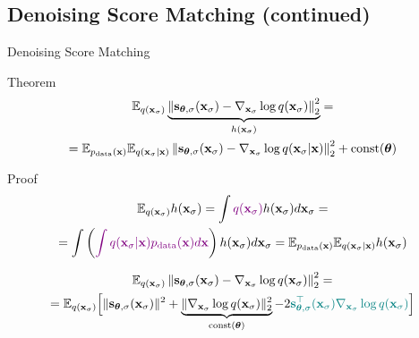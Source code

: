 \documentclass{beamer}
\renewcommand{\eqpause}{}
\renewcommand{\nextonslide}[1]{#1}
\begin{document}
\subsection{Denoising Score Matching (continued)}
\begin{frame}{Denoising Score Matching}
	\begin{block}{Theorem}
	\vspace{-0.5cm}
	\begin{multline*}
		\mathbb{E}_{q(\mathbf{x}_{\sigma})}\underbrace{\left\| \mathbf{s}_{\boldsymbol{\theta}, \sigma}(\mathbf{x}_{\sigma}) - \nabla_{\mathbf{x}_{\sigma}} \log q(\mathbf{x}_{\sigma}) \right\|_2^2}_{h(\mathbf{x}_{\sigma})} = \\
		= \mathbb{E}_{p_{\text{data}}(\mathbf{x})} \mathbb{E}_{q(\mathbf{x}_{\sigma} | \mathbf{x})}\left\| \mathbf{s}_{\boldsymbol{\theta}, \sigma}(\mathbf{x}_{\sigma}) - \nabla_{\mathbf{x}_{\sigma}} \log q(\mathbf{x}_{\sigma} | \mathbf{x}) \right\|_2^2 + \text{const}(\boldsymbol{\theta})
	\end{multline*}
	\vspace{-0.5cm}
	\end{block}
    \eqpause
	\begin{block}{Proof}
		\vspace{-0.7cm}
		\begin{multline*}
			\bbE_{q(\bx_{\sigma})} h(\bx_{\sigma}) = \int {\color{violet}q(\bx_{\sigma})} h(\bx_{\sigma}) d\bx_{\sigma} 
			\nextonslide{= \\ = \int \left({\color{violet}\int q(\bx_{\sigma} | \bx) \pd(\bx) d\bx}\right) h(\bx_{\sigma}) d\bx_{\sigma} =  \bbE_{\pd(\bx)} \bbE_{q(\bx_{\sigma} | \bx)}  h(\bx_{\sigma})}
		\end{multline*}
        \eqpause
		\vspace{-0.7cm}
		{\small
		\begin{multline*}
			\bbE_{q(\bx_{\sigma})}\left\| \bs_{\btheta, \sigma}(\bx_{\sigma}) - \nabla_{\bx_{\sigma}} \log q(\bx_{\sigma}) \right\|_2^2 = \\ 
			\nextonslide{= \bbE_{q(\bx_{\sigma})} \Bigl[\| \bs_{\btheta, \sigma}(\bx_{\sigma}) \|^2 + \underbrace{\| \nabla_{\bx_{\sigma}} \log q(\bx_{\sigma}) \|_2^2}_{\text{const}(\btheta)} - 2 {\color{teal}\bs_{\btheta, \sigma}^\top(\bx_{\sigma}) \nabla_{\bx_{\sigma}} \log q(\bx_{\sigma})} \Bigr]}
		\end{multline*}
		}
	\end{block}
\end{frame}
\end{document}
